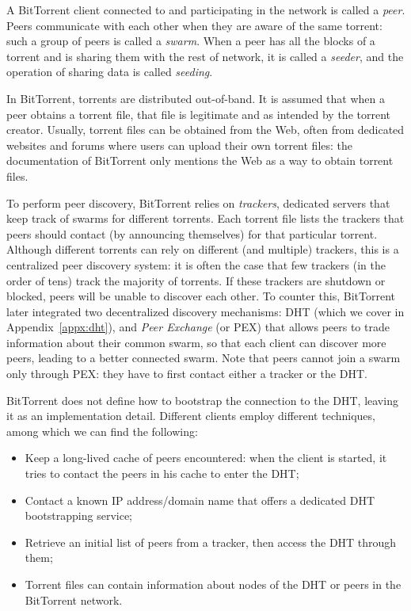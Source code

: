 \documentclass[mscthesis]{usiinfthesis}
\begin{document}
A BitTorrent client connected to and participating in the network is called a \emph{peer}. Peers communicate with each other when they are aware of the same torrent: such a group of peers is called a \emph{swarm}. When a peer has all the blocks of a torrent and is sharing them with the rest of network, it is called a \emph{seeder}, and the operation of sharing data is called \textit{seeding}.

In BitTorrent, torrents are distributed out-of-band. It is assumed that when a peer obtains a torrent file, that file is legitimate and as intended by the torrent creator. Usually, torrent files can be obtained from the Web, often from dedicated websites and forums where users can upload their own torrent files: the documentation of BitTorrent only mentions the Web as a way to obtain torrent files.

To perform peer discovery, BitTorrent relies on \emph{trackers}, dedicated servers that keep track of swarms for different torrents. Each torrent file lists the trackers that peers should contact (by announcing themselves) for that particular torrent. Although different torrents can rely on different (and multiple) trackers, this is a centralized peer discovery system: it is often the case that few trackers (in the order of tens) track the majority of torrents. If these trackers are shutdown or blocked, peers will be unable to discover each other. To counter this, BitTorrent later integrated two decentralized discovery mechanisms: DHT (which we cover in Appendix~\ref{appx:dht}), and \emph{Peer Exchange} (or PEX) that allows peers to trade information about their common swarm, so that each client can discover more peers, leading to a better connected swarm. Note that peers cannot join a swarm only through PEX: they have to first contact either a tracker or the DHT.

BitTorrent does not define how to bootstrap the connection to the DHT, leaving it as an implementation detail. Different clients employ different techniques, among which we can find the following:
\begin{itemize}
	\item Keep a long-lived cache of peers encountered: when the client is started, it tries to contact the peers in his cache to enter the DHT;
	\item Contact a known IP address/domain name that offers a dedicated DHT bootstrapping service;
	\item Retrieve an initial list of peers from a tracker, then access the DHT through them;
	\item Torrent files can contain information about nodes of the DHT or peers in the BitTorrent network.
\end{itemize}
\end{document}
